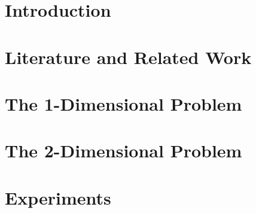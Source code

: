 \documentclass[a4paper,10pt,twoside]{report}
\begin{document}
\tableofcontents

\clearemptydoublepage







\chapter{Introduction}\label{chapter:Introduction}
\setcounter{page}{0}


\clearemptydoublepage

%

\chapter{Literature and Related Work}\label{chapter:Literature}

\clearemptydoublepage

\chapter{The 1-Dimensional Problem}\label{chapter:Alg1D}

\clearemptydoublepage

\chapter{The 2-Dimensional Problem}\label{chapter:Alg2D}

\clearemptydoublepage

\chapter{Experiments}\label{chapter:Experiments}

\clearemptydoublepage
\end{document}
